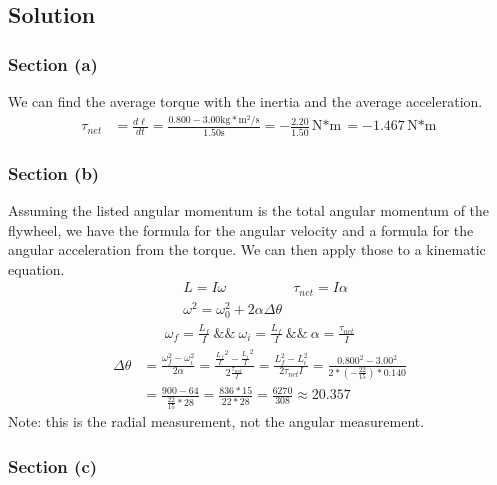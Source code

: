 \documentclass[12pt]{article}
\begin{document}
\subsection{Solution}
\subsubsection{Section (a)}
We can find the average torque with the inertia and the average acceleration.
\begin{align}
    \tau_{net}  &=  \frac{d\ell}{dt}
        =   \frac{0.800 - 3.00 \unit{\kilo\gram*\meter^2/\second}}{1.50 \unit{\second}}
        =   -\frac{2.20}{1.50}\unit{\newton*\meter}
        =   \boxed{-1.467\unit{\newton*\meter}}
\end{align}

\subsubsection{Section (b)}
Assuming the listed angular momentum is the total angular momentum of the flywheel, we have the formula for the angular velocity and a formula for the angular acceleration from the torque. We can then apply those to a kinematic equation.
\begin{align}
    &L = I\omega    &\tau_{net} = I\alpha\\
    &\omega^2 = \omega_0^2 + 2\alpha\Delta \theta
\end{align}
\begin{gather}
    \omega_f    =   \frac{L_f}{I}\ \&\&\ 
    \omega_i    =   \frac{L_f}{I}\ \&\&\ 
    \alpha  =   \frac{\tau_{net}}{I}
\end{gather}
\begin{align}
    \Delta\theta    &=  \frac{\omega_f^2 - \omega_i^2}{2\alpha}
        =   \frac{\frac{L_f}{I}^2 - \frac{L_i}{I}^2}{2\frac{\tau_{net}}{I}}
        =   \frac{L_f^2 - L_i^2}{2\tau_{net}I}
        =   \frac{0.800^2 - 3.00^2}{2*(-\frac{22}{15})*0.140}\\
        &=  \frac{900 - 64}{\frac{22}{15}*28}
        =   \frac{836*15}{22*28}
        =   \frac{6270}{308}
        \approx \boxed{20.357}
\end{align}
Note: this is the radial measurement, not the angular measurement.

\subsubsection{Section (c)}

\end{document}
